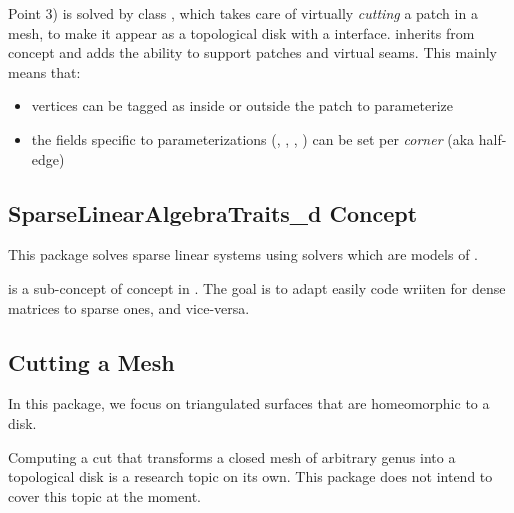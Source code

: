 Point 3) is solved by class , which takes care
of virtually {\em cutting}
a patch in a  mesh, to make it appear as a topological disk
with a  interface.
 inherits from concept  and adds
the ability to support patches and virtual seams.
This mainly means that:
\begin{itemize}
\item vertices can be tagged as inside or outside the patch to parameterize
\item the fields specific to parameterizations (, , , )
      can be set per {\em corner} (aka half-edge)
\end{itemize}


\subsection{SparseLinearAlgebraTraits\_d Concept}

This package solves sparse linear systems using solvers which are models
of .

 is a sub-concept of  concept
in .
The goal is to adapt easily code wriiten for dense matrices to sparse ones,
and vice-versa.


\subsection{Cutting a Mesh}

In this package, we focus on triangulated surfaces that are homeomorphic to a
disk.

Computing a cut that transforms a closed mesh of arbitrary genus into
a topological disk is a research topic on its own. This package does
not intend to cover this topic at the moment.



